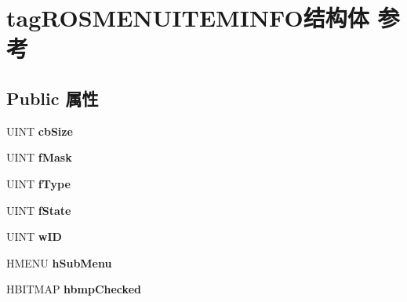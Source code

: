 \hypertarget{structtag_r_o_s_m_e_n_u_i_t_e_m_i_n_f_o}{}\section{tag\+R\+O\+S\+M\+E\+N\+U\+I\+T\+E\+M\+I\+N\+F\+O结构体 参考}
\label{structtag_r_o_s_m_e_n_u_i_t_e_m_i_n_f_o}
\subsection*{Public 属性}
\begin{DoxyCompactItemize}
\item 
\mbox{\label{structtag_r_o_s_m_e_n_u_i_t_e_m_i_n_f_o_a7b3c7e630323ee58c991137fd7fac95f}} 
U\+I\+NT {\bfseries cb\+Size}
\item 
\mbox{\label{structtag_r_o_s_m_e_n_u_i_t_e_m_i_n_f_o_ab7e6ed9b205fadaa242d5708a9355ade}} 
U\+I\+NT {\bfseries f\+Mask}
\item 
\mbox{\label{structtag_r_o_s_m_e_n_u_i_t_e_m_i_n_f_o_a85b80ebb2d9b24b00df94b9edbd92ded}} 
U\+I\+NT {\bfseries f\+Type}
\item 
\mbox{\label{structtag_r_o_s_m_e_n_u_i_t_e_m_i_n_f_o_afdba18e1ff09a8ff3ac006a6576e1e09}} 
U\+I\+NT {\bfseries f\+State}
\item 
\mbox{\label{structtag_r_o_s_m_e_n_u_i_t_e_m_i_n_f_o_ab9c89de583c0106c03e0776a7cfbbf0f}} 
U\+I\+NT {\bfseries w\+ID}
\item 
\mbox{\label{structtag_r_o_s_m_e_n_u_i_t_e_m_i_n_f_o_a6d336798761c38978c6caf2663e8725a}} 
H\+M\+E\+NU {\bfseries h\+Sub\+Menu}
\item 
\mbox{\label{structtag_r_o_s_m_e_n_u_i_t_e_m_i_n_f_o_aeeab4bb66a64860074bd82b1b3d72846}} 
H\+B\+I\+T\+M\+AP {\bfseries hbmp\+Checked}
\item 
\mbox{\label{structtag_r_o_s_m_e_n_u_i_t_e_m_i_n_f_o_a2b74f212202de5050dde1147f110aedd}} 

\end{DoxyCompactItemize}
